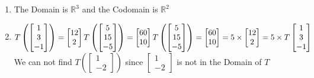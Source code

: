 \begin{SaveQuestion}
    \begin{enumerate}
      \item The Domain is $\mathbb{R}^3$ and the Codomain is $\mathbb{R}^2$
      \item $T\left(\begin{bmatrix}
                1\\3\\-1
            \end{bmatrix}\right)
            = \begin{bmatrix}
                12 \\
                2
            \end{bmatrix} \\
            T\left(\begin{bmatrix}
                5\\15\\-5
            \end{bmatrix}\right)
            = \begin{bmatrix}
                60\\10
            \end{bmatrix}\\
             T\left(\begin{bmatrix}
                5\\15\\-5
            \end{bmatrix}\right)
            = \begin{bmatrix}
                60\\10
            \end{bmatrix}
            = 5 \times\begin{bmatrix}
                12 \\
                2
            \end{bmatrix} = 5 \times T\begin{bmatrix}
            1\\3\\-1
            \end{bmatrix}$ \\
            We can not find $T\left(\begin{bmatrix}
                1 \\
                -2
            \end{bmatrix}\right)$ since $\begin{bmatrix}
                1 \\
                -2
            \end{bmatrix}$ is not in the Domain of $T$


\end{enumerate}
\end{SaveQuestion}
